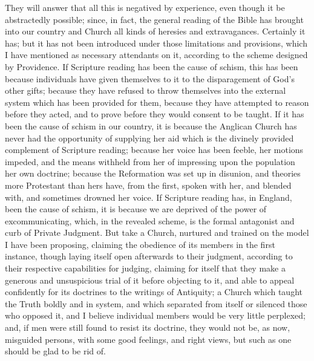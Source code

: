 They will answer that all this is negatived by experience, even
though it be abstractedly possible; since, in fact, the general
reading of the Bible has brought into our country and Church all kinds
of heresies and extravagances. Certainly it has; but it has not been
introduced under those limitations and provisions, which I have
mentioned as necessary attendants on it, according to the scheme
designed by Providence. If Scripture reading has been the cause of
schism, this has been because individuals have given themselves to it
to the disparagement of God's other gifts; because they have refused
to throw themselves into the external system which has been provided
for them, because they have attempted to reason before they acted, and
to prove before they would consent to be taught. If it has been the
cause of schism in our country, it is because the Anglican Church has
never had the opportunity of supplying her aid which is the divinely
provided complement of Scripture reading; because her voice has been
feeble, her motions impeded, and the means withheld from her of
impressing upon the population her own doctrine; because the
Reformation was set up in disunion, and theories more Protestant than
hers have, from the first, spoken with her, and blended with, and
sometimes drowned her voice. If Scripture reading has, in England,
been the cause of schism, it is because we are deprived of the power
of excommunicating, which, in the revealed scheme, is the formal
antagonist and curb of Private Judgment. But take a Church, nurtured
and trained on the model I have been proposing, claiming the obedience
of its members in the first instance, though laying itself open
afterwards to their judgment, according to their respective
capabilities for judging, claiming for itself that they make a
generous and unsuspicious trial of it before objecting to it, and able
to appeal confidently for its doctrines to the writings of Antiquity; a Church which taught the Truth boldly and in system, and
which separated from itself or silenced those who opposed it, and I
believe individual members would be very little perplexed; and, if men
were still found to resist its doctrine, they would not be, as now,
misguided persons, with some good feelings, and right views, but such
as one should be glad to be rid of.

